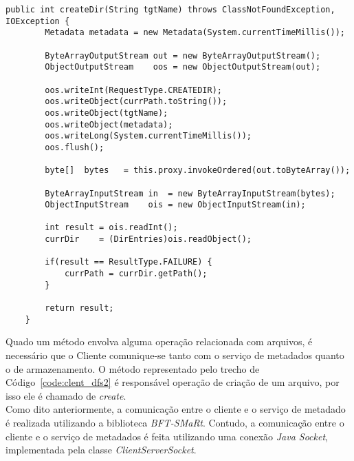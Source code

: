 \begin{lstlisting}[basicstyle=\ttfamily\footnotesize, frame=single, caption=Exemplo de método da classe ClientDFS, label=code:clent_dfs1]	
	public int createDir(String tgtName) throws ClassNotFoundException, IOException {
		Metadata metadata = new Metadata(System.currentTimeMillis());
		
		ByteArrayOutputStream out = new ByteArrayOutputStream();
		ObjectOutputStream    oos = new ObjectOutputStream(out);
		
		oos.writeInt(RequestType.CREATEDIR);
		oos.writeObject(currPath.toString());
		oos.writeObject(tgtName);
		oos.writeObject(metadata);
		oos.writeLong(System.currentTimeMillis());
		oos.flush();
		
		byte[]  bytes   = this.proxy.invokeOrdered(out.toByteArray());
		
		ByteArrayInputStream in  = new ByteArrayInputStream(bytes);
		ObjectInputStream    ois = new ObjectInputStream(in);
		
		int result = ois.readInt();
		currDir    = (DirEntries)ois.readObject();
		
		if(result == ResultType.FAILURE) {
			currPath = currDir.getPath();
		}
		
		return result;
	}
\end{lstlisting}

Quado um método envolva alguma operação relacionada com arquivos, é necessário que o Cliente comunique-se tanto com o serviço de metadados quanto o de armazenamento. O método representado pelo trecho de Código~\ref{code:clent_dfs2} é responsável operação de criação de um arquivo, por isso ele é chamado de \textit{create}.
\\

Como dito anteriormente, a comunicação entre o cliente e o serviço de metadado é realizada utilizando a biblioteca  \textit{BFT-SMaRt}. Contudo, a comunicação entre o cliente e o serviço de metadados é feita utilizando uma conexão \textit{Java Socket}, implementada pela classe \textit{ClientServerSocket}.
\\
\\
\\
\\
\\
\\
\\

